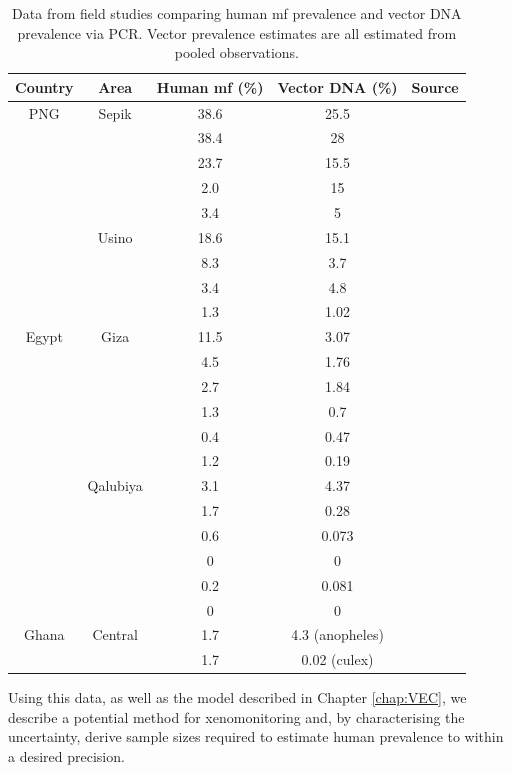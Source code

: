 \begin{table}
    \centering
    \begin{tabular}{c|c|c|c|c}
        Country & Area & Human mf (\%) & Vector DNA (\%) & Source  \\
        \hline
        PNG & Sepik & 38.6 & 25.5 & \cite{Reimer2013_insecticidal} \\
         &  & 38.4 & 28 & \\
         &  & 23.7 & 15.5 & \\
         &  & 2.0 & 15 &  \\
         &  & 3.4 & 5 &  \\
        & Usino & 18.6 & 15.1 & \cite{Weil2008} \\
         &  & 8.3 & 3.7 & \\
         &  & 3.4 & 4.8 &  \\
         &  & 1.3 & 1.02 &  \\
         \hline
        Egypt & Giza & 11.5 & 3.07 & \cite{Farid2007,Ramzy2006} \\
         &  & 4.5 & 1.76 &  \\
         &  & 2.7 & 1.84 &  \\
         &  & 1.3 & 0.7 &  \\
         &  & 0.4 & 0.47 &  \\
         &  & 1.2 & 0.19 &  \\
         & Qalubiya & 3.1 & 4.37 & \cite{Farid2007,Ramzy2006} \\
        &  & 1.7 & 0.28 &  \\
        &  & 0.6 & 0.073 &  \\
        &  & 0 & 0 &  \\
        &  & 0.2 & 0.081 & \\
        &  & 0 & 0 & \\
        \hline
        Ghana & Central & 1.7 & 4.3 (anopheles) & \cite{Owusu2015} \\
         &  & 1.7 & 0.02 (culex) & 
    \end{tabular}
    \caption[Xenomonitoring field study data.]{Data from field studies comparing human mf prevalence and vector DNA prevalence via PCR. Vector prevalence estimates are all estimated from pooled observations.}
    \label{tab:MXdata}
\end{table}

Using this data, as well as the model described in Chapter \ref{chap:VEC}, we describe a potential method for xenomonitoring and, by characterising the uncertainty, derive sample sizes required to estimate human prevalence to within a desired precision.

